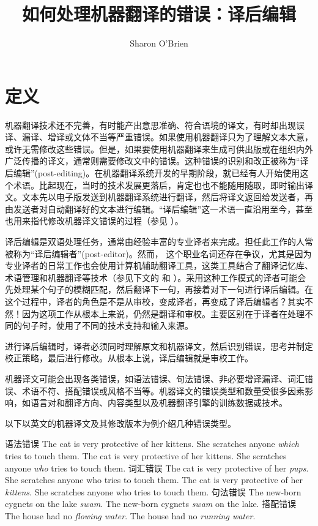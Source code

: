 \documentclass[output=paper,colorlinks,citecolor=brown]{langscibook}
\author{Sharon O'Brien\affiliation{都柏林城市大学}}
\title{如何处理机器翻译的错误：译后编辑}
\begin{document}
\maketitle


\section{定义}

机器翻译技术还不完善，有时能产出意思准确、符合语境的译文，有时却出现误译、漏译、增译或文体不当等严重错误。如果使用机器翻译只为了理解文本大意，或许无需修改这些错误。但是，如果要使用机器翻译来生成可供出版或在组织内外广泛传播的译文，通常则需要修改文中的错误。这种错误的识别和改正被称为“译后编辑”(post-editing)。在机器翻译系统开发的早期阶段，就已经有人开始使用这个术语。比起现在，当时的技术发展更落后，肯定也也不能随用随取，即时输出译文。文本先以电子版发送到机器翻译系统进行翻译，然后将译文返回给发送者，再由发送者对自动翻译好的文本进行编辑。“译后编辑”这一术语一直沿用至今，甚至也用来指代修改机器译文错误的过程（参见 ）。

译后编辑是双语处理任务，通常由经验丰富的专业译者来完成。担任此工作的人常被称为“译后编辑者”(post-editor)。然而， 这个职业名词还存在争议，尤其是因为专业译者的日常工作也会使用计算机辅助翻译工具，这类工具结合了翻译记忆库、术语管理和机器翻译等技术（参见下文的 和 ）。采用这种工作模式的译者可能会先处理某个句子的模糊匹配，然后翻译下一句，再接着对下一句进行译后编辑。在这个过程中，译者的角色是不是从审校，变成译者，再变成了译后编辑者？其实不然！因为这项工作从根本上来说，仍然是翻译和审校。主要区别在于译者在处理不同的句子时，使用了不同的技术支持和输入来源。

进行译后编辑时，译者必须同时理解原文和机器译文，然后识别错误，思考并制定校正策略，最后进行修改。从根本上说，译后编辑就是审校工作。

机器译文可能会出现各类错误，如语法错误、句法错误、非必要增译漏译、词汇错误、术语不符、搭配错误或风格不当等。机器译文的错误类型和数量受很多因素影响，如语言对和翻译方向、内容类型以及机器翻译引擎的训练数据或技术。

以下以英文的机器译文及其修改版本为例介绍几种错误类型。

\ea
语法错误
\ea The cat is very protective of her kittens. She scratches anyone \textit{which} tries to touch them.
\ex The cat is very protective of her kittens. She scratches anyone \textit{who} tries to touch them.
\z
\ex
词汇错误
\ea The cat is very protective of her \textit{pups}. She scratches anyone who tries to touch them.
\ex The cat is very protective of her \textit{kittens}. She scratches anyone who tries to touch them.
\z
\ex
句法错误
\ea The new-born cygnets on the lake \textit{swam}.
\ex The new-born cygnets \textit{swam} on the lake.
\z
\ex
搭配错误
\ea The house had no \textit{flowing water}.
\ex The house had no \textit{running water}.
\z
\z
\end{document}
